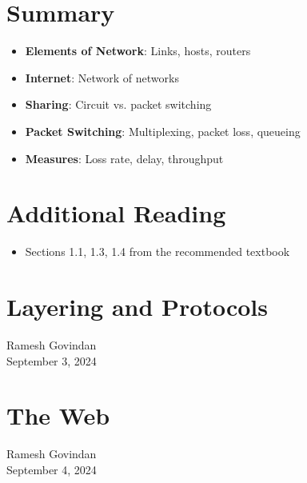 \documentclass[9pt]{extarticle}
\begin{document}
\begin{multicols*}{3}
{\color{sectioncolor}\section*{\centering Summary}}
\begin{itemize}
    \item \textbf{Elements of Network}: Links, hosts, routers
    \item \textbf{Internet}: Network of networks
    \item \textbf{Sharing}: Circuit vs. packet switching
    \item \textbf{Packet Switching}: Multiplexing, packet loss, queueing
    \item \textbf{Measures}: Loss rate, delay, throughput
\end{itemize}

{\color{sectioncolor}\section*{\centering Additional Reading}}
\begin{itemize}
    \item Sections 1.1, 1.3, 1.4 from the recommended textbook
\end{itemize}

{\color{sectioncolor}\section*{\centering Layering and Protocols}}
Ramesh Govindan\\
September 3, 2024


{\color{sectioncolor}\section*{\centering The Web}}
Ramesh Govindan\\
September 4, 2024


\end{multicols*}
\end{document}
